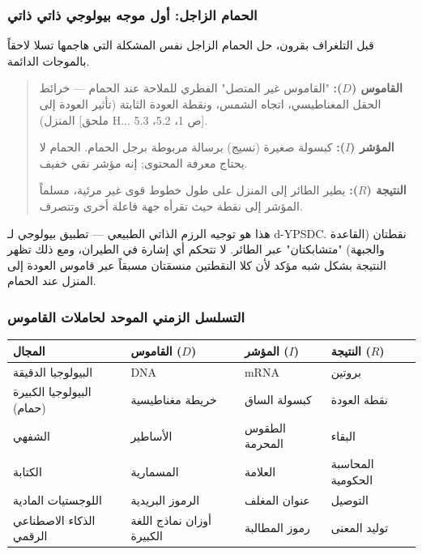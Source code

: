 \documentclass[12pt,a4paper]{article}
\begin{document}
	\subsubsection{الحمام الزاجل: أول موجه بيولوجي ذاتي ذاتي}
	
	قبل التلغراف بقرون، حل الحمام الزاجل نفس المشكلة التي هاجمها تسلا لاحقاً بالموجات الدائمة.
	
	\begin{quote}
		\textbf{القاموس (\(D\)):} "القاموس غير المتصل" الفطري للملاحة عند الحمام — خرائط الحقل المغناطيسي، اتجاه الشمس، ونقطة العودة الثابتة (تأثير العودة إلى المنزل) [ملحق H... ص 1، 5.2، 5.3].
		
		\textbf{المؤشر (\(I\)):} كبسولة صغيرة (نسيج) برسالة مربوطة برجل الحمام. الحمام لا يحتاج معرفة المحتوى; إنه مؤشر نقي خفيف.
		
		\textbf{النتيجة (\(R\)):} يطير الطائر إلى المنزل على طول خطوط قوى غير مرئية، مسلماً المؤشر إلى نقطة حيث تقرأه جهة فاعلة أخرى وتتصرف.
	\end{quote}
	
	هذا هو توجيه الرزم الذاتي الطبيعي — تطبيق بيولوجي لـ d-YPSDC. نقطتان (القاعدة والجبهة) "متشابكتان" عبر الطائر. لا تتحكم أي إشارة في الطيران، ومع ذلك تظهر النتيجة بشكل شبه مؤكد لأن كلا النقطتين منسقتان مسبقاً عبر قاموس العودة إلى المنزل عند الحمام.
	
	\subsubsection{التسلسل الزمني الموحد لحاملات القاموس}
	
	\begin{center}
		\begin{tabular}{p{3cm}p{3.5cm}p{3.5cm}p{3cm}}
			\toprule
			\textbf{المجال} & \textbf{القاموس (\(D\))} & \textbf{المؤشر (\(I\))} & \textbf{النتيجة (\(R\))} \\
			\midrule
			البيولوجيا الدقيقة & DNA & mRNA & بروتين \\
			البيولوجيا الكبيرة (حمام) & خريطة مغناطيسية & كبسولة الساق & نقطة العودة \\
			الشفهي & الأساطير & الطقوس المحرمة & البقاء \\
			الكتابة & المسمارية & العلامة & المحاسبة الحكومية \\
			اللوجستيات المادية & الرموز البريدية & عنوان المغلف & التوصيل \\
			الذكاء الاصطناعي الرقمي & أوزان نماذج اللغة الكبيرة & رموز المطالبة & توليد المعنى \\
			\bottomrule
		\end{tabular}
	\end{center}
	
\end{document}
